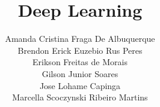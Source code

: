 \title{Deep Learning}
\label{chp:deep-learning}
\author{Amanda Cristina Fraga De Albuquerque\\
        Brendon Erick Euzebio Rus Peres\\
        Erikson Freitas de Morais\\
        Gilson Junior Soares\\
        Jose Lohame Capinga\\
        Marcella Scoczynski Ribeiro Martins}



\maketitle









